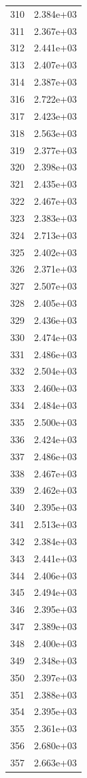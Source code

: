 \documentclass[12pt]{article}
\begin{document}
\begin{longtable}{@{}cc@{}}
310 & 2.384e+03 \\
311 & 2.367e+03 \\
312 & 2.441e+03 \\
313 & 2.407e+03 \\
314 & 2.387e+03 \\
316 & 2.722e+03 \\
317 & 2.423e+03 \\
318 & 2.563e+03 \\
319 & 2.377e+03 \\
320 & 2.398e+03 \\
321 & 2.435e+03 \\
322 & 2.467e+03 \\
323 & 2.383e+03 \\
324 & 2.713e+03 \\
325 & 2.402e+03 \\
326 & 2.371e+03 \\
327 & 2.507e+03 \\
328 & 2.405e+03 \\
329 & 2.436e+03 \\
330 & 2.474e+03 \\
331 & 2.486e+03 \\
332 & 2.504e+03 \\
333 & 2.460e+03 \\
334 & 2.484e+03 \\
335 & 2.500e+03 \\
336 & 2.424e+03 \\
337 & 2.486e+03 \\
338 & 2.467e+03 \\
339 & 2.462e+03 \\
340 & 2.395e+03 \\
341 & 2.513e+03 \\
342 & 2.384e+03 \\
343 & 2.441e+03 \\
344 & 2.406e+03 \\
345 & 2.494e+03 \\
346 & 2.395e+03 \\
347 & 2.389e+03 \\
348 & 2.400e+03 \\
349 & 2.348e+03 \\
350 & 2.397e+03 \\
351 & 2.388e+03 \\
354 & 2.395e+03 \\
355 & 2.361e+03 \\
356 & 2.680e+03 \\
357 & 2.663e+03 \\

\end{longtable}
\end{document}
